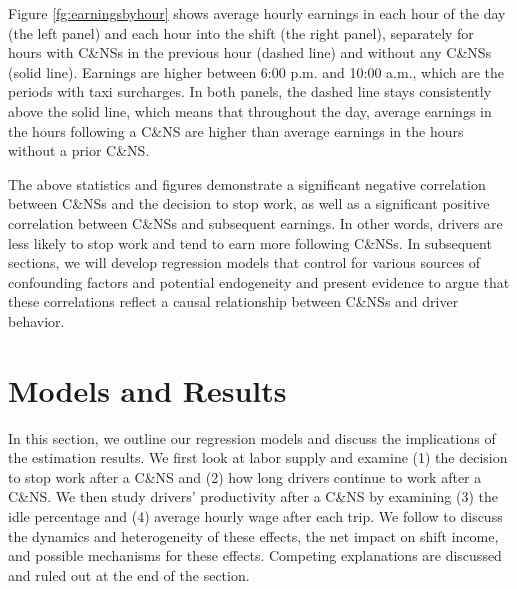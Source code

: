 \documentclass[reviewmode]{restud}
\begin{document}
Figure \ref{fg:earningsbyhour} shows average hourly earnings in each hour of the day (the left panel) and each hour into the shift (the right panel), separately for hours with C\&NSs in the previous hour (dashed line) and without any C\&NSs (solid line). Earnings are higher between 6:00 p.m. and 10:00 a.m., which are the periods with taxi surcharges. In both panels, the dashed line stays consistently above the solid line, which means that throughout the day, average earnings in the hours following a C\&NS are higher than  average earnings in the hours without a prior C\&NS.

The above statistics and figures demonstrate a significant negative correlation between C\&NSs and the decision to stop work, as well as a significant positive correlation between C\&NSs and subsequent earnings. In other words, drivers are less likely to stop work and tend to earn more following C\&NSs. In subsequent sections, we will develop regression models  that control for various sources of confounding factors and potential endogeneity and present evidence to argue that these correlations reflect a causal relationship between C\&NSs and driver behavior.

\section{Models and Results}
In this section, we outline our regression models and discuss the implications of the estimation results. We first look at labor supply and examine (1) the decision to stop work after a C\&NS and (2) how long drivers continue to work after a C\&NS. We then study drivers' productivity after a C\&NS by examining (3) the idle percentage and (4) average hourly wage after each trip. We follow to discuss the dynamics and heterogeneity of these effects, the net impact on shift income, and possible mechanisms for these effects. Competing explanations are discussed and ruled out at the end of the section.
\end{document}
